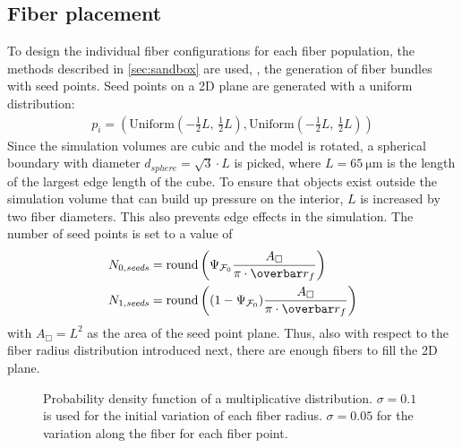 \subsection{Fiber placement}
%
To design the individual fiber configurations for each fiber population, the methods described in \cref{sec:sandbox} are used, \ie{}, the generation of fiber bundles with seed points.
Seed points on a 2D plane are generated with a uniform distribution:
\begin{align}
p_i = (\mathrm{Uniform}(-\frac{1}{2}\mathit{L}, \, \frac{1}{2}\mathit{L}), \mathrm{Uniform}(-\frac{1}{2}\mathit{L}, \, \frac{1}{2}\mathit{L}))
\end{align}
Since the simulation volumes are cubic and the model is rotated, a spherical boundary with diameter $d_{\mathit{sphere}}=\sqrt{3} \cdot \mathit{L}$ is picked, where $\mathit{L}=\SI{65}{\micro\meter}$ is the length of the largest edge length of the cube.
To ensure that objects exist outside the simulation volume that can build up pressure on the interior, $\mathit{L}$ is increased by two fiber diameters.
This also prevents edge effects in the simulation.
The number of seed points is set to a value of
\begin{align}
N_{0,\mathit{seeds}} &= \round \left(\modelPsi \frac{A_{\Box}}{\pi \cdot \fiberRadiusMean}\right)\\
N_{1,\mathit{seeds}} &= \round \left((1-\modelPsi) \frac{A_{\Box}}{\pi \cdot \fiberRadiusMean}\right)
\end{align}
with $A_{\Box}=L^2$ as the area of the seed point plane.
Thus, also with respect to the fiber radius distribution introduced next, there are enough fibers to fill the 2D plane.
\par
%
\begin{figure}[!t]
\centering
\caption{Probability density function of a multiplicative  distribution.
$\sigma=0.1$ is used for the initial variation of each fiber radius.
$\sigma=0.05$ for the variation along the fiber for each fiber point.}
\label{fig:logNormal}
\end{figure}

